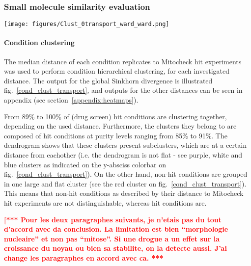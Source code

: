 \subsubsection{Small molecule similarity evaluation}

\begin{figure*}[ht!]
\centerline{\texttt{[image: figures/Clust\_0transport\_ward\_ward.png]}}

\caption{Drug screen condition - Mitocheck siRNA two-dimensional hierarchical clustering using global Sinkhorn divergence. Ward method was used in combination with the Euclidean distance.}
\label{cond_clust_transport}
\end{figure*}

\paragraph{Condition clustering}
The median distance of each condition replicates to Mitocheck hit
experiments was used to perform condition hierarchical clustering, for
each investigated distance. The output for the global Sinkhorn
divergence is illustrated fig.~\ref{cond_clust_transport}, and outputs
for the other distances can be seen in appendix (see
section~\ref{appendix:heatmaps}). 

From 89\% to 100\% of (drug screen) hit conditions are clustering
together, depending on the used distance. Furthermore, the clusters
they belong to are composed of hit conditions at purity levels ranging
from 85\% to 91\%. The dendrogram shows that these clusters present
subclusters, which are at a certain distance from eachother (i.e. the
dendrogram is not flat - see purple, white and blue clusters as
indicated on the y-absciss colorbar on
fig.~\ref{cond_clust_transport}). On the other hand, non-hit
conditions are grouped in one large and flat cluster (see the red
cluster on fig.~\ref{cond_clust_transport}). This means that non-hit
conditions as described by their distance to Mitocheck hit experiments
are not distinguishable, whereas hit conditions are. 

\textcolor{red}{\bf [*** Pour les deux paragraphes suivants, je
  n'etais pas du tout d'accord avec da conclusion. La limitation est
  bien ``morphologie nucleaire'' et non pas ``mitose''. Si une drogue
  a un effet sur la croissance du noyau ou bien sa stabilite, on la
  detecte aussi. J'ai change les paragraphes en accord avec ca. ***}

